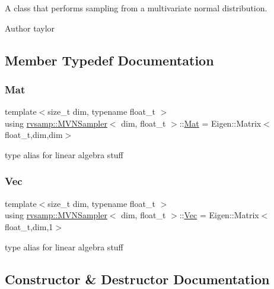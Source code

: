A class that performs sampling from a multivariate normal distribution. 

\begin{DoxyAuthor}{Author}
taylor 
\end{DoxyAuthor}


\subsection{Member Typedef Documentation}
\mbox{\label{classrvsamp_1_1MVNSampler_ad6891a72b508fd59263c6d62b6bffd14}} 
\subsubsection{\texorpdfstring{Mat}{Mat}}
{\footnotesize\ttfamily template$<$size\+\_\+t dim, typename float\+\_\+t $>$ \\
using \hyperlink{classrvsamp_1_1MVNSampler}{rvsamp\+::\+M\+V\+N\+Sampler}$<$ dim, float\+\_\+t $>$\+::\hyperlink{classrvsamp_1_1MVNSampler_ad6891a72b508fd59263c6d62b6bffd14}{Mat} =  Eigen\+::\+Matrix$<$float\+\_\+t,dim,dim$>$}

type alias for linear algebra stuff \mbox{\label{classrvsamp_1_1MVNSampler_a1110bc1695c5c959914602dbaf2f6878}} 
\subsubsection{\texorpdfstring{Vec}{Vec}}
{\footnotesize\ttfamily template$<$size\+\_\+t dim, typename float\+\_\+t $>$ \\
using \hyperlink{classrvsamp_1_1MVNSampler}{rvsamp\+::\+M\+V\+N\+Sampler}$<$ dim, float\+\_\+t $>$\+::\hyperlink{classrvsamp_1_1MVNSampler_a1110bc1695c5c959914602dbaf2f6878}{Vec} =  Eigen\+::\+Matrix$<$float\+\_\+t,dim,1$>$}

type alias for linear algebra stuff 

\subsection{Constructor \& Destructor Documentation}
\mbox{\label{classrvsamp_1_1MVNSampler_a5fa6029b9bd840c4b08a01f67a97afc6}} 
